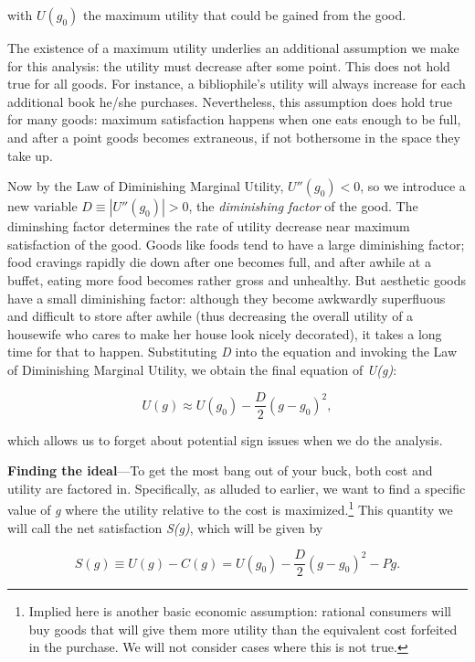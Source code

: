 \documentclass[11pt]{article}
\begin{document}
with $U(g_0)$ the maximum utility that could be gained from the good.

The existence of a maximum utility underlies an additional assumption we make for this analysis: the utility must decrease after some point. This does not hold true for all goods. For instance, a bibliophile's utility will always increase for each additional book he/she purchases. Nevertheless, this assumption does hold true for many goods: maximum satisfaction happens when one eats enough to be full, and after a point goods becomes extraneous, if not bothersome in the space they take up.

Now by the Law of Diminishing Marginal Utility, ${U}''(g_0) < 0$, so we introduce a new variable $D \equiv |U''(g_0)| > 0$, the \textit{diminishing factor} of the good. The diminshing factor determines the rate of utility decrease near maximum satisfaction of the good. Goods like foods tend to have a large diminishing factor; food cravings rapidly die down after one becomes full, and after awhile at a buffet, eating more food becomes rather gross and unhealthy. But aesthetic goods have a small diminishing factor: although they become awkwardly superfluous and difficult to store after awhile (thus decreasing the overall utility of a housewife who cares to make her house look nicely decorated), it takes a long time for that to happen. Substituting \textit{D} into the equation and invoking the Law of Diminishing Marginal Utility, we obtain the final equation of \textit{U(g)}:

\begin{equation}
	U(g) \approx U(g_0) - \frac{D}{2}(g - g_0)^2,
\end{equation}

which allows us to forget about potential sign issues when we do the analysis.

\vspace{16pt}
\textbf{Finding the ideal}---To get the most bang out of your buck, both cost and utility are factored in. Specifically, as alluded to earlier, we want to find a specific value of \textit{g} where the utility relative to the cost is maximized.\footnote{Implied here is another basic economic assumption: rational consumers will buy goods that will give them more utility than the equivalent cost forfeited in the purchase. We will not consider cases where this is not true.} This quantity we will call the net satisfaction \textit{S(g)}, which will be given by

\begin{equation}
	S(g) \equiv U(g) - C(g) = U(g_0) - \frac{D}{2}(g - g_0)^2 - Pg.
\end{equation}
\end{document}
